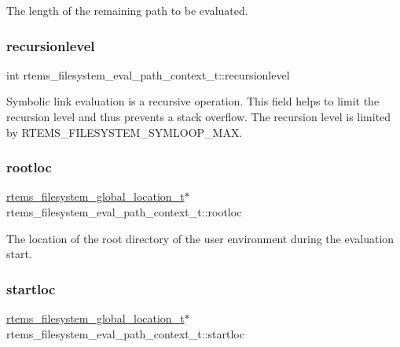 The length of the remaining path to be evaluated. \mbox{\label{structrtems__filesystem__eval__path__context__t_a067816cfa618d7a0cd718b8bb82a284c}} 
\subsubsection{\texorpdfstring{recursionlevel}{recursionlevel}}
{\footnotesize\ttfamily int rtems\+\_\+filesystem\+\_\+eval\+\_\+path\+\_\+context\+\_\+t\+::recursionlevel}

Symbolic link evaluation is a recursive operation. This field helps to limit the recursion level and thus prevents a stack overflow. The recursion level is limited by R\+T\+E\+M\+S\+\_\+\+F\+I\+L\+E\+S\+Y\+S\+T\+E\+M\+\_\+\+S\+Y\+M\+L\+O\+O\+P\+\_\+\+M\+AX. \mbox{\label{structrtems__filesystem__eval__path__context__t_abad8ed35464aaa22a2299db3feb1402f}} 
\subsubsection{\texorpdfstring{rootloc}{rootloc}}
{\footnotesize\ttfamily \mbox{\hyperlink{structrtems__filesystem__global__location__t}{rtems\+\_\+filesystem\+\_\+global\+\_\+location\+\_\+t}}$\ast$ rtems\+\_\+filesystem\+\_\+eval\+\_\+path\+\_\+context\+\_\+t\+::rootloc}

The location of the root directory of the user environment during the evaluation start. \mbox{\label{structrtems__filesystem__eval__path__context__t_ae50d64ee35aba1ddf2bc70a87b9de99f}} 
\subsubsection{\texorpdfstring{startloc}{startloc}}
{\footnotesize\ttfamily \mbox{\hyperlink{structrtems__filesystem__global__location__t}{rtems\+\_\+filesystem\+\_\+global\+\_\+location\+\_\+t}}$\ast$ rtems\+\_\+filesystem\+\_\+eval\+\_\+path\+\_\+context\+\_\+t\+::startloc}


